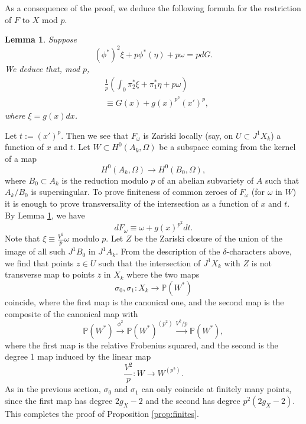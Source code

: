\documentclass[11pt]{amsart}
\theoremstyle{plain}
\newtheorem{lemma}{Lemma}
\theoremstyle{definition}
\begin{document}
As a consequence of the proof, we deduce the following formula for the restriction of $F$ to $X$ mod $p$.
\begin{lemma}\label{lemma:F}
Suppose 
\[
(\phi ^* )^2 \xi +p\phi ^* (\eta )+p\omega =pdG.
\]
We deduce that, mod $p$,
\begin{align*}
& \frac{1}{p}(\int _0 \pi _2 ^* \xi +\pi _1 ^* \eta +p\omega )  \\
& \equiv G(x)+g(x)^{p^2 } (x')^p ,
\end{align*}
where $\xi =g(x)dx$. 
\end{lemma}
Let $t:=(x')^p$. Then we see that $F_{\omega }$ is Zariski locally (say, on $U\subset J^1 X_k $) a function of $x$ and $t$. Let $W\subset H^0 (A_k ,\Omega )$ be a subspace coming from the kernel of a map
\[
H^0 (A_k ,\Omega )\to H^0 (B_0 ,\Omega ),
\]
where $B_0 \subset A_k$ is the reduction modulo $p$ of an abelian subvariety of $A$ such that $A_k /B_0 $ is supersingular. To prove finiteness of common zeroes of $F_{\omega }$ (for $\omega $ in $W$) it is enough to prove transversality of the intersection as a function of $x$ and $t$.  By Lemma \ref{lemma:F}, we have
\[
dF_{\omega }\equiv \omega +g(x)^{p^2 }dt.
\]
Note that $\xi \equiv \frac{V^2 }{p}\omega $ modulo $p$.
Let $Z$ be the Zariski closure of the union of the image of all such $J^1 B_0$ in $J^1 A_k $. From the description of the $\delta $-characters above, we find that points $z\in U$ such that the intersection of $J^1 X_k $ with $Z$ is not transverse map to points $\overline{z}$ in $X_k$ where the two maps
\[
\sigma _0 ,\sigma _1 :X_k \to \mathbb{P}(W^* )
\]
coincide, where the first map is the canonical one, and the second map is the composite of the canonical map with
\[
\mathbb{P}(W^* )\stackrel{\phi ^2 }{\longrightarrow } \mathbb{P}(W^* )^{(p^2 )}\stackrel{V^2 /p}{\longrightarrow }\mathbb{P}(W^* ),
\]
where the first map is the relative Frobenius squared, and the second is the degree 1 map induced by the linear map
\[
\frac{V^2 }{p}:W\to W^{(p^2 )}.
\]
As in the previous section, $\sigma _0$ and $\sigma _1$ can only coincide at finitely many points, since the first map has degree $2g_X-2$ and the second has degree $p^2 (2g_X-2)$. This completes the proof of Proposition \ref{prop:finites}.
\end{document}
